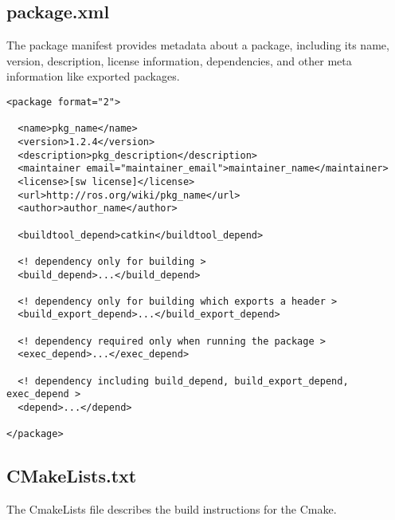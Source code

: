    
\subsection{package.xml}
    The package manifest provides metadata about a package, including its name, version, description, license information, dependencies, and other meta information like exported packages.

\begin{verbatim}
<package format="2">

  <name>pkg_name</name>
  <version>1.2.4</version>
  <description>pkg_description</description>
  <maintainer email="maintainer_email">maintainer_name</maintainer>
  <license>[sw license]</license>
  <url>http://ros.org/wiki/pkg_name</url>
  <author>author_name</author>

  <buildtool_depend>catkin</buildtool_depend>

  <! dependency only for building >
  <build_depend>...</build_depend>

  <! dependency only for building which exports a header >
  <build_export_depend>...</build_export_depend>

  <! dependency required only when running the package >
  <exec_depend>...</exec_depend>

  <! dependency including build_depend, build_export_depend, exec_depend >
  <depend>...</depend>

</package>
\end{verbatim}
    





\subsection{CMakeLists.txt}
    The CmakeLists file describes the build instructions for the Cmake.

